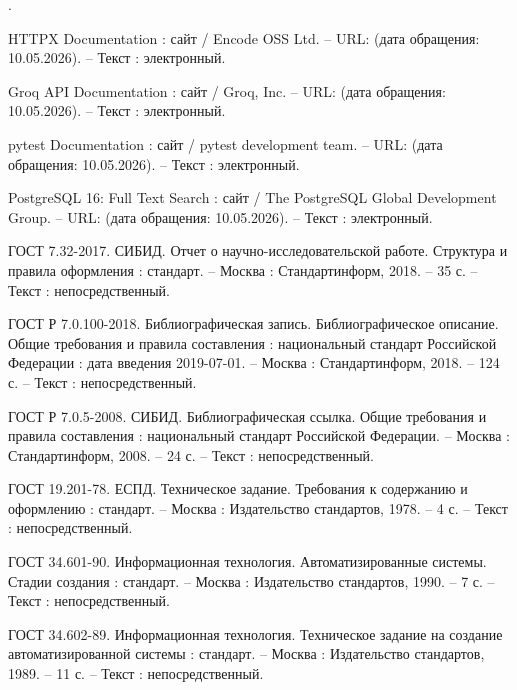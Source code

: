 \begin{list}{.}
\item HTTPX Documentation : сайт / Encode OSS Ltd. – URL:  (дата обращения: 10.05.2026). – Текст : электронный.

\item Groq API Documentation : сайт / Groq, Inc. – URL:  (дата обращения: 10.05.2026). – Текст : электронный.

\item pytest Documentation : сайт / pytest development team. – URL:  (дата обращения: 10.05.2026). – Текст : электронный.

\item PostgreSQL 16: Full Text Search : сайт / The PostgreSQL Global Development Group. – URL:  (дата обращения: 10.05.2026). – Текст : электронный.

\item ГОСТ 7.32-2017. СИБИД. Отчет о научно-исследовательской работе. Структура и правила оформления : стандарт. – Москва : Стандартинформ, 2018. – 35 с. – Текст : непосредственный.

\item ГОСТ Р 7.0.100-2018. Библиографическая запись. Библиографическое описание. Общие требования и правила составления : национальный стандарт Российской Федерации : дата введения 2019-07-01. – Москва : Стандартинформ, 2018. – 124 с. – Текст : непосредственный.

\item ГОСТ Р 7.0.5-2008. СИБИД. Библиографическая ссылка. Общие требования и правила составления : национальный стандарт Российской Федерации. – Москва : Стандартинформ, 2008. – 24 с. – Текст : непосредственный.

\item ГОСТ 19.201-78. ЕСПД. Техническое задание. Требования к содержанию и оформлению : стандарт. – Москва : Издательство стандартов, 1978. – 4 с. – Текст : непосредственный.

\item ГОСТ 34.601-90. Информационная технология. Автоматизированные системы. Стадии создания : стандарт. – Москва : Издательство стандартов, 1990. – 7 с. – Текст : непосредственный.

\item ГОСТ 34.602-89. Информационная технология. Техническое задание на создание автоматизированной системы : стандарт. – Москва : Издательство стандартов, 1989. – 11 с. – Текст : непосредственный.


\end{list}

